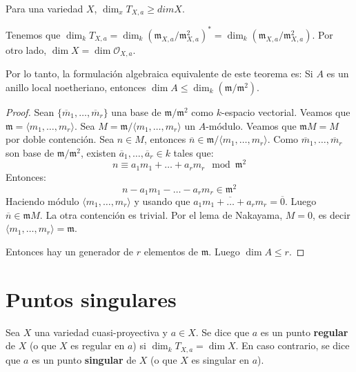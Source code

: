 \documentclass[ACGA.tex]{subfiles}
\begin{document}
\begin{teorema}
Para una variedad $X$, $\dim_x T_{X,a} ≥ dim X$.

Tenemos que $\dim_k T_{X,a} = \dim_k (\mathfrak{m}_{X,a} / \mathfrak{m}^2_{X,a})^* = \dim_k (\mathfrak{m}_{X,a} / \mathfrak{m}^2_{X,a})$. Por otro lado, $\dim X = \dim \mathcal{O}_{X,a}$.

Por lo tanto, la formulación algebraica equivalente de este teorema es: Si $A$ es un anillo local noetheriano, entonces $\dim A ≤ \dim_k (\mathfrak{m} / \mathfrak{m}^2)$.
\end{teorema}

\begin{proof}
Sean $\{\overline{m}_1,\dots,\overline{m}_r\}$ una base de $\mathfrak{m}/\mathfrak{m}^2$ como $k$-espacio vectorial. Veamos que $\mathfrak{m}=\langle m_1,\dots,m_r\rangle$. Sea $M = \mathfrak{m} / \langle m_1,\dots,m_r \rangle$ un $A$-módulo. Veamos que $\mathfrak{m} M = M$ por doble contención. Sea $n \in M$, entonces $\overline{n} \in \mathfrak{m}/\langle m_1,\dots,m_r \rangle$. Como $ \overline{m}_1,\dots,\overline{m}_r$ son base de $\mathfrak{m}/\mathfrak{m}^2$, existen $\overline{a}_1,\dots,\overline{a}_r \in k$ tales que:
\[ n \equiv a_1m_1+\dots+a_rm_r \mod{\mathfrak{m}^2}\]
Entonces:
\[ n-a_1m_1-\dots-a_rm_r \in \mathfrak{m}^2 \]
Haciendo módulo $\langle m_1,\dots,m_r\rangle$ y usando que $\overline{a_1m_1+\dots+a_rm_r} = \overline{0}$. Luego $\overline{n} \in \mathfrak{m} M$. La otra contención es trivial. Por el lema de Nakayama, $M = 0$, es decir $\langle m_1,\dots,m_r\rangle = \mathfrak{m}$.

Entonces hay un generador de $r$ elementos de $\mathfrak{m}$. Luego $\dim A ≤ r$.
\end{proof}

\section{Puntos singulares}

\begin{defi}
 Sea $X$ una variedad cuasi-proyectiva y $a\in X$. Se dice que $a$ es un punto {\bf regular} de $X$ (o que $X$ es regular en $a$) si $\dim_k T_{X,a}=\dim X$. En caso contrario, se dice que $a$ es un punto {\bf singular} de $X$ (o que $X$ es singular en $a$).
\end{defi}
\end{document}
